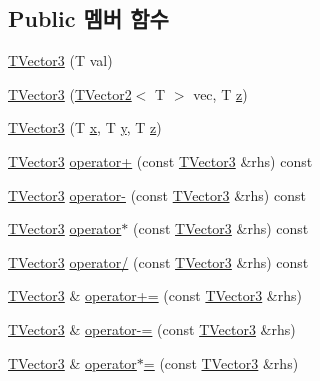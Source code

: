 \subsection*{Public 멤버 함수}
\begin{DoxyCompactItemize}
\item 
\hyperlink{classcpf_1_1_t_vector3_a31544bebbd3d8737adf44460256b57fd}{T\+Vector3} (T val)
\item 
\hyperlink{classcpf_1_1_t_vector3_a67fdeb48db080d90957d29b1c75cf3d1}{T\+Vector3} (\hyperlink{classcpf_1_1_t_vector2}{T\+Vector2}$<$ T $>$ vec, T \hyperlink{classcpf_1_1_t_vector3_ae7ea5f4b24c3438a44eb6b0fdfe02823}{z})
\item 
\hyperlink{classcpf_1_1_t_vector3_a26f5c99ef0caf8794709b5df049cd660}{T\+Vector3} (T \hyperlink{classcpf_1_1_t_vector3_ad3df42808358a64c518d6349ede446d8}{x}, T \hyperlink{classcpf_1_1_t_vector3_a2371a0583e76dcc80c6f10dd168cde1b}{y}, T \hyperlink{classcpf_1_1_t_vector3_ae7ea5f4b24c3438a44eb6b0fdfe02823}{z})
\item 
\hyperlink{classcpf_1_1_t_vector3}{T\+Vector3} \hyperlink{classcpf_1_1_t_vector3_ad0591c5ed4645d82dbcbe6796af3ba3f}{operator+} (const \hyperlink{classcpf_1_1_t_vector3}{T\+Vector3} \&rhs) const
\item 
\hyperlink{classcpf_1_1_t_vector3}{T\+Vector3} \hyperlink{classcpf_1_1_t_vector3_ace31dd2825b1b64c3840e13d9101252d}{operator-\/} (const \hyperlink{classcpf_1_1_t_vector3}{T\+Vector3} \&rhs) const
\item 
\hyperlink{classcpf_1_1_t_vector3}{T\+Vector3} \hyperlink{classcpf_1_1_t_vector3_a62c5ad92cb019a2322419e808d3ceab7}{operator$\ast$} (const \hyperlink{classcpf_1_1_t_vector3}{T\+Vector3} \&rhs) const
\item 
\hyperlink{classcpf_1_1_t_vector3}{T\+Vector3} \hyperlink{classcpf_1_1_t_vector3_ab9705825c33bf595373843caa18c91f3}{operator/} (const \hyperlink{classcpf_1_1_t_vector3}{T\+Vector3} \&rhs) const
\item 
\hyperlink{classcpf_1_1_t_vector3}{T\+Vector3} \& \hyperlink{classcpf_1_1_t_vector3_a32e8331dbaec9ff1cc18982c0c847ebe}{operator+=} (const \hyperlink{classcpf_1_1_t_vector3}{T\+Vector3} \&rhs)
\item 
\hyperlink{classcpf_1_1_t_vector3}{T\+Vector3} \& \hyperlink{classcpf_1_1_t_vector3_a8ce621a24abceaeeb02de90e99b2716e}{operator-\/=} (const \hyperlink{classcpf_1_1_t_vector3}{T\+Vector3} \&rhs)
\item 
\hyperlink{classcpf_1_1_t_vector3}{T\+Vector3} \& \hyperlink{classcpf_1_1_t_vector3_a4b76b4847b1fdc99f27bd2d4c13cba05}{operator$\ast$=} (const \hyperlink{classcpf_1_1_t_vector3}{T\+Vector3} \&rhs)

\end{DoxyCompactItemize}

